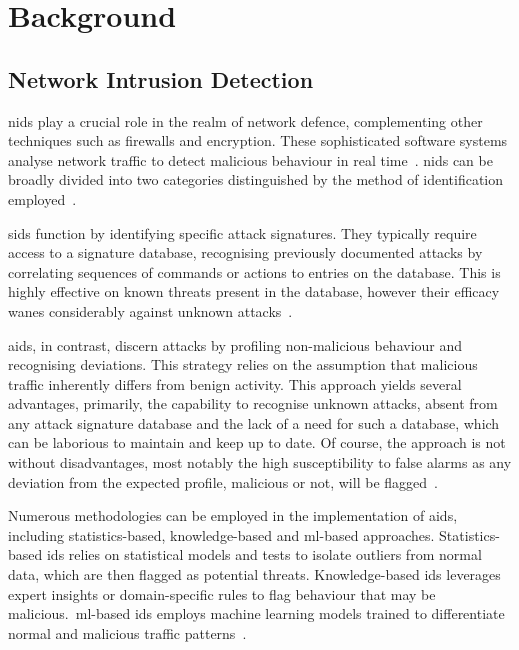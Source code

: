 \chapter{Background}%
\label{chp:background}

\section{Network Intrusion Detection}%
\label{sec:nids}

\gls{nids} play a crucial role in the realm of network defence, complementing
other techniques such as firewalls and encryption. These sophisticated software
systems analyse network traffic to detect malicious behaviour in real
time~\cite{survey2}.
\gls{nids} can be broadly divided into two categories distinguished by the
method of identification employed~\cite{survey1}.

\gls{sids} function by identifying specific attack signatures. They typically
require access to a signature database, recognising previously documented
attacks by correlating sequences of commands or actions to entries on the
database. This is highly effective on known threats present in the database,
however their efficacy wanes considerably against unknown
attacks~\cite{survey1, survey2}.

\gls{aids}, in contrast, discern attacks by profiling non-malicious behaviour
and recognising deviations. This strategy relies on the assumption that
malicious traffic inherently differs from benign activity. This approach yields
several advantages, primarily, the capability to recognise unknown attacks,
absent from any attack signature database and the lack of a need for such a
database, which can be laborious to maintain and keep up to date. Of course,
the approach is not without disadvantages, most notably the high susceptibility
to false alarms as any deviation from the expected profile, malicious or not,
will be flagged~\cite{survey1, survey2}.

Numerous methodologies can be employed in the implementation of \gls{aids},
including statistics-based, knowledge-based and \gls{ml}-based approaches.
Statistics-based \gls{ids} relies on statistical models and tests to isolate
outliers from normal data, which are then flagged as potential threats.
Knowledge-based \gls{ids} leverages expert insights or domain-specific rules to
flag behaviour that may be malicious.\ \gls{ml}-based \gls{ids} employs machine
learning models trained to differentiate normal and malicious traffic
patterns~\cite{survey1}.

